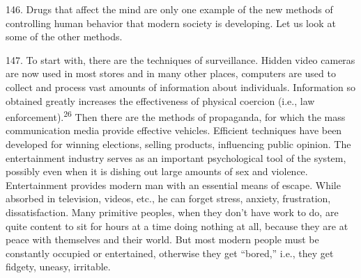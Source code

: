 \documentclass{article}
\begin{document}
146.  Drugs that affect the mind are only one example of the new methods of controlling human 
behavior that modern society is developing.  Let us look at some of the other methods. \vspace{\baselineskip} \newpage

147.  To start with, there are the techniques of surveillance.  Hidden video cameras are now used 
in most stores and in many other places, computers are used to collect and process vast amounts 
of information about individuals.  Information so obtained greatly increases the effectiveness of 
physical coercion (i.e., law enforcement).\textsuperscript{26} Then there are the methods of propaganda, for which 
the  mass  communication  media  provide  effective  vehicles.   Efficient  techniques  have  been  
developed for winning elections, selling products, influencing public opinion.  The entertainment 
industry serves as an important psychological tool of the system, possibly even when it is dishing 
out  large  amounts  of  sex  and  violence.   Entertainment  provides  modern  man  with  an  essential  
means  of  escape.   While  absorbed  in  television,  videos,  etc.,  he  can  forget  stress,  anxiety,  
frustration, dissatisfaction.  Many primitive peoples, when they don’t have work to do, are quite 
content to sit for hours at a time doing nothing at all, because they are at peace with themselves 
and their world.  But most modern people must be constantly occupied or entertained, otherwise 
they get “bored,” i.e., they get fidgety, uneasy, irritable. \vspace{\baselineskip}
\end{document}

